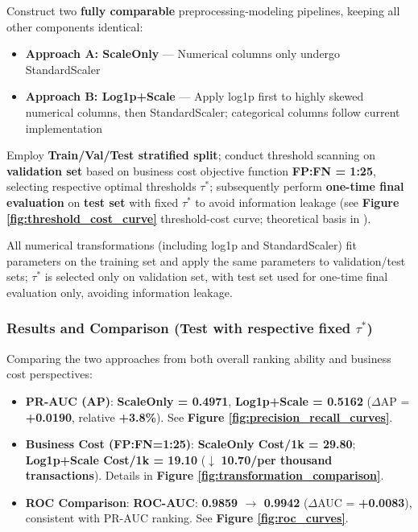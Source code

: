 \documentclass[sigplan,screen]{acmart}
\begin{document}
Construct two \textbf{fully comparable} preprocessing-modeling pipelines, keeping all other components identical:

    \begin{itemize}
    \item \textbf{Approach A: ScaleOnly} --- Numerical columns only undergo StandardScaler
    \item \textbf{Approach B: Log1p+Scale} --- Apply log1p first to highly skewed numerical columns, then StandardScaler; categorical columns follow current implementation
    \end{itemize}
    
Employ \textbf{Train/Val/Test stratified split}; conduct threshold scanning on \textbf{validation set} based on business cost objective function \textbf{FP:FN = 1:25}, selecting respective optimal thresholds $\tau^*$; subsequently perform \textbf{one-time final evaluation} on \textbf{test set} with fixed $\tau^*$ to avoid information leakage (see \textbf{Figure \ref{fig:threshold_cost_curve}} threshold-cost curve; theoretical basis in \citealp{elkan2001foundations}).

All numerical transformations (including log1p and StandardScaler) fit parameters on the training set and apply the same parameters to validation/test sets; $\tau^*$ is selected only on validation set, with test set used for one-time final evaluation only, avoiding information leakage.

\subsubsection{Results and Comparison (Test with respective fixed $\tau^*$)}

Comparing the two approaches from both overall ranking ability and business cost perspectives:

\begin{itemize}
    \item \textbf{PR-AUC (AP)}: \textbf{ScaleOnly = 0.4971}, \textbf{Log1p+Scale = 0.5162} ($\Delta$AP = \textbf{+0.0190}, relative \textbf{+3.8\%}). See \textbf{Figure \ref{fig:precision_recall_curves}}.
    \item \textbf{Business Cost (FP:FN=1:25)}: \textbf{ScaleOnly Cost/1k = 29.80}; \textbf{Log1p+Scale Cost/1k = 19.10} ($\downarrow$ \textbf{10.70/per thousand transactions}). Details in \textbf{Figure \ref{fig:transformation_comparison}}.
    \item \textbf{ROC Comparison}: \textbf{ROC-AUC}: \textbf{0.9859 $\rightarrow$ 0.9942} ($\Delta$AUC = \textbf{+0.0083}), consistent with PR-AUC ranking. See \textbf{Figure \ref{fig:roc_curves}}.
\end{itemize}
\end{document}
